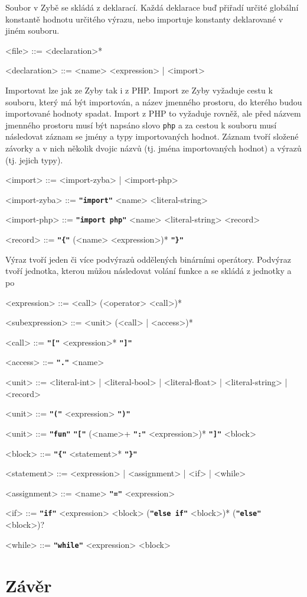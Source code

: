 \documentclass[a4paper,12pt]{article}
\def\emphasis #1{\textbf{\texttt{"#1"}}}
\begin{document}
Soubor v Zybě se skládá z deklarací. Každá deklarace buď přiřadí určité globální konstantě hodnotu určitého výrazu, nebo importuje konstanty deklarované v jiném souboru.
\begin{grammar}
<file> ::= <declaration>*

<declaration> ::= <name> <expression> | <import>
\end{grammar}

Importovat lze jak ze Zyby tak i z PHP. Import ze Zyby vyžaduje cestu k souboru, který má být importován, a název jmenného prostoru, do kterého budou importované hodnoty spadat. Import z PHP to vyžaduje rovněž, ale před názvem jmenného prostoru musí být napsáno slovo \texttt{php} a za cestou k souboru musí následovat záznam se jmény a typy importovaných hodnot. Záznam tvoří složené závorky a v nich několik dvojic názvů (tj. jména importovaných hodnot) a výrazů (tj. jejich typy).
\begin{grammar}
<import> ::= <import-zyba> | <import-php>

<import-zyba> ::= \emphasis{import} <name> <literal-string>

<import-php> ::= \emphasis{import php} <name> <literal-string> <record>

<record> ::= \emphasis{\{} (<name> <expression>)* \emphasis{\}}
\end{grammar}

Výraz tvoří jeden či více podvýrazů oddělených binárními operátory. Podvýraz tvoří jednotka, kterou můžou následovat volání funkce a  se skládá z jednotky a po
\begin{grammar}
<expression> ::= <call> (<operator> <call>)*

<subexpression> ::= <unit> (<call> | <access>)*

<call> ::= \emphasis{[} <expression>* \emphasis{]}

<access> ::= \emphasis{.} <name>
\end{grammar}

\begin{grammar}
<unit> ::= <literal-int> | <literal-bool> | <literal-float> | <literal-string> | <record>

<unit> ::= \emphasis{(} <expression> \emphasis{)}

<unit> ::= \emphasis{fun} \emphasis{[} (<name>+ \emphasis{:} <expression>)* \emphasis{]} <block>


<block> ::= \emphasis{\{} <statement>* \emphasis{\}}

<statement> ::= <expression> | <assignment> | <if> | <while>

<assignment> ::= <name> \emphasis{=} <expression>

<if> ::= \emphasis{if} <expression> <block> (\emphasis{else if} <block>)* (\emphasis{else} <block>)?

<while> ::= \emphasis{while} <expression> <block>
\end{grammar} 

\section{Závěr}

\newpage
\printbibliography[heading=bibintoc, title={Použitá literatura}]
\newpage
\end{document}
